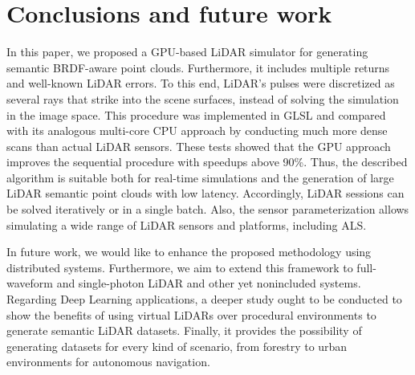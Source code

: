 \section{Conclusions and future work}

In this paper, we proposed a GPU-based LiDAR simulator for generating semantic BRDF-aware point clouds. Furthermore, it includes multiple returns and well-known LiDAR errors. To this end, LiDAR's pulses were discretized as several rays that strike into the scene surfaces, instead of solving the simulation in the image space. This procedure was implemented in GLSL and compared with its analogous multi-core CPU approach by conducting much more dense scans than actual LiDAR sensors. These tests showed that the GPU approach improves the sequential procedure with speedups above 90\%. Thus, the described algorithm is suitable both for real-time simulations and the generation of large LiDAR semantic point clouds with low latency. Accordingly, LiDAR sessions can be solved iteratively or in a single batch. Also, the sensor parameterization allows simulating a wide range of LiDAR sensors and platforms, including ALS.

In future work, we would like to enhance the proposed methodology using distributed systems. Furthermore, we aim to extend this framework to full-waveform and single-photon LiDAR \cite{tachella_real-time_2019} and other yet nonincluded systems. Regarding Deep Learning applications, a deeper study ought to be conducted to show the benefits of using virtual LiDARs over procedural environments to generate semantic LiDAR datasets. Finally, it provides the possibility of generating datasets for every kind of scenario, from forestry to urban environments for autonomous navigation.